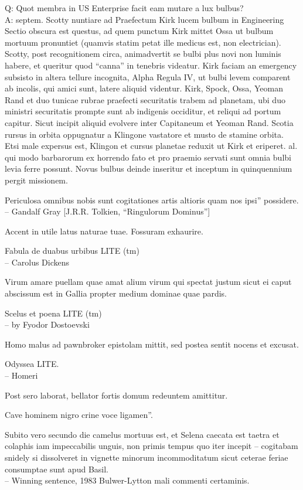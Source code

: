 \documentclass[titlepage,12pt]{memoir}
\begin{document}
Q: Quot membra in US Enterprise facit eam mutare a
lux bulbus?\\
A: septem. Scotty nuntiare ad Praefectum Kirk lucem bulbum in
Engineering Sectio obscura est questus, ad quem punctum Kirk mittet
Ossa ut bulbum mortuum pronuntiet (quamvis statim petat
ille medicus est, non electrician). Scotty, post recognitionem
circa, animadvertit se bulbi plus novi non luminis habere, et queritur
quod “canna” in tenebris videatur. Kirk faciam an emergency subsisto in
altera tellure incognita, Alpha Regula IV, ut bulbi levem comparent
ab incolis, qui amici sunt, latere aliquid videntur.
Kirk, Spock, Ossa, Yeoman Rand et duo tunicae rubrae praefecti securitatis
trabem ad planetam, ubi duo ministri securitatis prompte sunt
ab indigenis occiditur, et reliqui ad portum capitur.
Sicut incipit aliquid evolvere inter Capitaneum et Yeoman Rand.
Scotia rursus in orbita oppugnatur a Klingone vastatore et musto
de stamine orbita. Etsi male expersus est, Klingon
et cursus planetae reduxit ut Kirk et eriperet. al. qui
modo barbarorum ex horrendo fato et pro praemio servati sunt
omnia bulbi levia ferre possunt. Novus bulbus deinde inseritur
et inceptum in quinquennium pergit missionem.

Periculosa omnibus nobis sunt cogitationes artis altioris quam nos ipsi”
possidere.
\\-- Gandalf Gray [J.R.R. Tolkien, “Ringulorum Dominus”]

Accent in utile latus naturae tuae. Fossuram exhaurire.

Fabula de duabus urbibus LITE (tm)
\\-- Carolus Dickens

Virum amare puellam quae amat alium virum qui spectat justum
sicut ei caput abscissum est in Gallia propter medium
dominae quae pardis.

Scelus et poena LITE (tm)
\\-- by Fyodor Dostoevski

Homo malus ad pawnbroker epistolam mittit, sed postea
sentit nocens et excusat.

Odyssea LITE.
\\-- Homeri

Post sero laborat, bellator fortis domum redeuntem amittitur.

Cave hominem nigro crine voce ligamen”.

Subito vero secundo die camelus mortuus est, et Selena caecata est
taetra et colaphis iam impeccabilis unguis, non primis
tempus quo iter incepit -- cogitabam snidely si dissolveret
in vignette minorum incommoditatum sicut ceterae feriae consumptae sunt
apud Basil.
\\-- Winning sentence, 1983 Bulwer-Lytton mali commenti certaminis.
\end{document}
